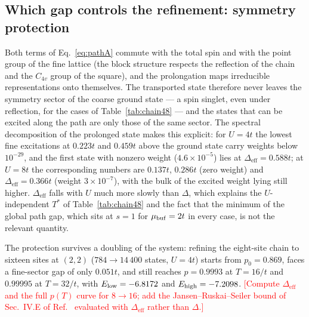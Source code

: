 \documentclass[
  aps,
  prc,
  reprint,
  superscriptaddress,
  floatfix,
  nofootinbib
]{revtex4-2}
\newcommand{\todo}[1]{\textcolor{red}{[#1]}}
\newcommand{\Deff}{\Delta_{\mathrm{eff}}}
\begin{document}
\subsection{Which gap controls the refinement: symmetry protection}
\label{sec:symmetry}
Both terms of Eq.~\eqref{eq:pathA} commute with the total spin and with
the point group of the fine lattice (the block structure respects the
reflection of the chain and the $C_{4v}$ group of the square), and the
prolongation maps irreducible representations onto themselves.  The
transported state therefore never leaves the symmetry sector of the coarse
ground state --- a spin singlet, even under reflection, for the cases of
Table~\ref{tab:chain48} --- and the states that can be excited along the
path are only those of the same sector.  The spectral decomposition of the
prolonged state makes this explicit: for $U=4t$ the lowest fine excitations
at $0.223t$ and $0.459t$ above the ground state carry weights below
$10^{-29}$, and the first state with nonzero weight ($4.6\times10^{-5}$)
lies at $\Deff=0.588t$; at $U=8t$ the corresponding numbers are $0.137t$,
$0.286t$ (zero weight) and $\Deff=0.366t$ (weight $3\times10^{-7}$), with
the bulk of the excited weight lying still higher.  $\Deff$ falls with $U$
much more slowly than $\Delta$, which explains the $U$-independent $T^*$ of
Table~\ref{tab:chain48} and the fact that the minimum of the global path
gap, which sits at $s=1$ for $\mu_{\rm buf}=2t$ in every case, is not the
relevant quantity.

The protection survives a doubling of the system: refining the eight-site
chain to sixteen sites at $(2,2)$ ($784\to14\,400$ states, $U=4t$) starts
from $p_0=0.869$, faces a fine-sector gap of only $0.051t$, and still
reaches $p=0.9993$ at $T=16/t$ and $0.99995$ at $T=32/t$, with
$E_{\rm low}=-6.8172$ and $E_{\rm high}=-7.2098$.  \todo{Compute $\Deff$
and the full $p(T)$ curve for $8\to16$; add the Jansen--Ruskai--Seiler
bound of Sec.~IV.E of Ref.~\cite{EigenQPairing2026} evaluated with
$\Deff$ rather than $\Delta$.}
\end{document}
